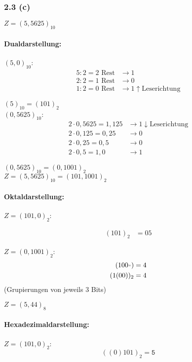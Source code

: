 \documentclass[11pt,a4paper]{article}
\begin{document}
\newpage
\subsubsection{2.3 (c)}
$Z = (5,5625)_{10}$

\paragraph{Dualdarstellung:}
$(5,0)_{10}$:
\begin{align*}
5 : 2 = 2 \mbox{ Rest} &\rightarrow 1\\
2 : 2 = 1 \mbox{ Rest} &\rightarrow 0\\
1 : 2 = 0 \mbox{ Rest} &\rightarrow 1 \uparrow \mbox{Leserichtung}
\end{align*}

$(5)_{10} = (101)_2$\\

$(0,5625)_{10}$:
\begin{align*}
2 \cdot 0,5625 = 1,125 &\rightarrow 1 \downarrow \mbox{Leserichtung}\\
2 \cdot 0,125 = 0,25 &\rightarrow 0\\
2 \cdot 0,25 = 0,5 &\rightarrow 0\\
2 \cdot 0,5 = 1,0 &\rightarrow 1
\end{align*}

$(0,5625)_{10} = (0,1001)_2$\\

$Z = (5,5625)_{10} = (101,1001)_2$

\paragraph{Oktaldarstellung:}
$Z = (101,0)_2$:

\begin{align*}
(101)_2 &= 05
\end{align*}

$Z = (0,1001)_2$:
\begin{align*}
(100_") &= 4\\
(1(00))_2 &= 4
\end{align*}
(Grupierungen von jeweils 3 Bits)

$Z = (5,44)_8$

\paragraph{Hexadezimaldarstellung:}
$Z = (101,0)_2$:
\begin{equation*}
((0)101)_2 = \mathtt{5}
\end{equation*}
\end{document}
